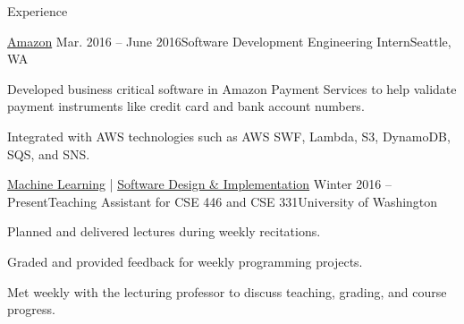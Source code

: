 \documentclass{resume} %
\begin{document}
\begin{rSection}{Experience}
  \begin{rSubsection}{\href{https://www.amazon.com/}{Amazon}}
    {Mar. 2016 -- June 2016}{Software Development Engineering Intern}{Seattle, WA}
  \item Developed business critical software in Amazon Payment Services to help validate payment instruments like credit card and bank account numbers.
  \item Integrated with AWS technologies such as AWS SWF, Lambda, S3, DynamoDB, SQS, and SNS.
  \end{rSubsection}
  
  \begin{rSubsection}{\href{https://courses.cs.washington.edu/courses/cse446/17sp/}{Machine Learning} | \href{https://courses.cs.washington.edu/courses/cse331/16wi/}{Software Design \& Implementation}}
    {Winter 2016 -- Present}{Teaching Assistant for CSE 446 and CSE 331}{University of Washington}
  \item Planned and delivered lectures during weekly recitations.
  \item Graded and provided feedback for weekly programming projects.
  \item Met weekly with the lecturing professor to discuss teaching, grading, and course progress.
  \end{rSubsection}
  
\end{rSection}






\end{document}

